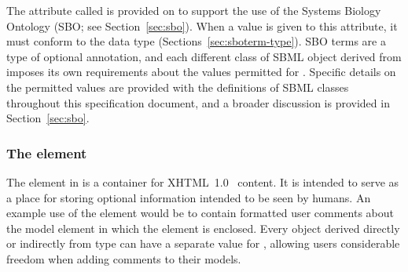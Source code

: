 The attribute called  is provided on \SBase to support
the use of the Systems Biology Ontology (SBO; see
Section~\ref{sec:sbo}).  When a value is
given to this attribute, it must conform to the data type
 (Sections~\ref{sec:sboterm-type}).  SBO terms
are a type of optional annotation, and each different class of
SBML object derived from \SBase imposes its own requirements about
the values permitted for .  Specific details on the
permitted values are provided with the definitions of SBML classes
throughout this specification document, and a broader discussion
is provided in Section~\ref{sec:sbo}.


\subsubsection{The  element}
\label{sec:notes}

The element  in \SBase is a container for
XHTML~1.0~\citep{pemberton:2002} content.  It is intended to serve
as a place for storing optional information intended to be seen by
humans.  An example use of the  element would be to
contain formatted user comments about the model element in which
the  element is enclosed.  Every object derived
directly or indirectly from type \SBase can have a separate value
for , allowing users considerable freedom when adding
comments to their models.


